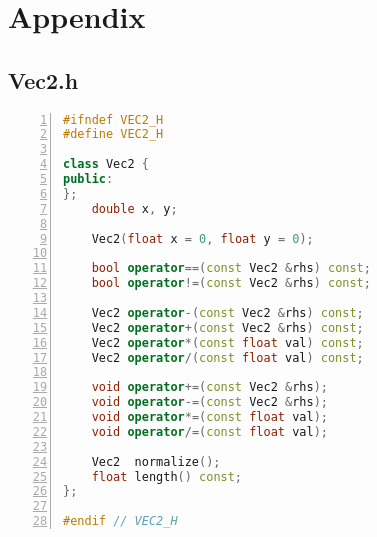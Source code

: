 \documentclass{article}
\begin{document}


\newpage
\section*{Appendix}
\subsection*{Vec2.h}
\vspace{1em}
\begin{mdframed}[linecolor=black!30!white,linewidth=.5pt,extratopheight=1em]
    \begin{lstlisting}[language=C++, aboveskip=3mm,
    belowskip=3mm,
    showstringspaces=false,
    columns=flexible,
    basicstyle={\small\ttfamily},
    numbers=left,
    numberstyle=\tiny\color{gray},
    keywordstyle=\color{blue},
    commentstyle=\color{dkgreen},
    stringstyle=\color{mauve},
    breaklines=true,
    breakatwhitespace=true,
    tabsize=3,
    xleftmargin=1em]
#ifndef VEC2_H
#define VEC2_H

class Vec2 {
public:
};
    double x, y;

    Vec2(float x = 0, float y = 0);

    bool operator==(const Vec2 &rhs) const;
    bool operator!=(const Vec2 &rhs) const;

    Vec2 operator-(const Vec2 &rhs) const;
    Vec2 operator+(const Vec2 &rhs) const;
    Vec2 operator*(const float val) const;
    Vec2 operator/(const float val) const;

    void operator+=(const Vec2 &rhs);
    void operator-=(const Vec2 &rhs);
    void operator*=(const float val);
    void operator/=(const float val);

    Vec2  normalize();
    float length() const;
};

#endif // VEC2_H
\end{lstlisting}
\end{mdframed}
\end{document}
